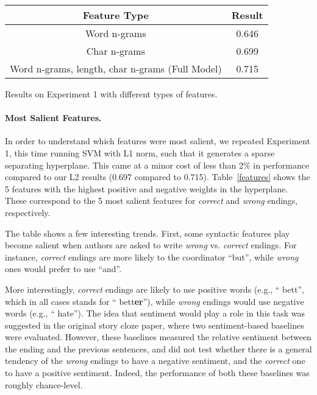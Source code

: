 \documentclass[11pt,a4paper]{article}
\newcommand{\tabref}[1]{Table~\ref{#1}}
\begin{document}
\begin{table}[!t]
\begin{center}
\small
\begin{tabular}{|c|c|} \hline
{\bf Feature Type} & {\bf Result}\\ \hline
Word n-grams & 0.646 \\ \hline
Char n-grams & 0.699 \\ \hline
Word n-grams, length, char n-grams (Full Model) & 0.715 \\ \hline

\end{tabular}
\end{center}
\caption{\label{subgroups}}
Results on Experiment 1 with different types of features.
\end{table}

\paragraph{Most Salient Features.}
In order to understand which features were most salient, we repeated Experiment 1, this time running SVM with L1 norm, such that it generates a sparse separating hyperplane. 
This came at a minor cost of less than 2\% in performance compared to our L2 results (0.697 compared to 0.715).  
\tabref{features} shows the 5 features with the highest positive and negative weights in the hyperplane. 
These correspond to the 5 most salient features for {\it correct} and {\it wrong} endings, respectively.

The table shows a few interesting trends. 
First, some syntactic features play become salient when authors are asked to write {\it wrong} vs. {\it correct} endings.
For instance, {\it correct} endings are more likely to the coordinator ``but'', while {\it wrong} ones would prefer to use ``and''.

More interestingly, {\it correct} endings are likely to use positive words (e.g., `` bett'', which in all cases stands for `` bett{\bf er}''), while  {\it wrong} endings would use negative words (e.g., `` hate''). 
The idea that  sentiment would play a role in this task was suggested in the original story cloze paper, where two sentiment-based baselines were evaluated. 
However, these baselines measured the relative sentiment between the ending and the previous sentences, and did not test whether there is a general tendency of the {\it wrong} endings to have a negative sentiment, and the {\it correct} one to have a positive sentiment.
Indeed, the performance of both these baselines was roughly chance-level.
\end{document}
